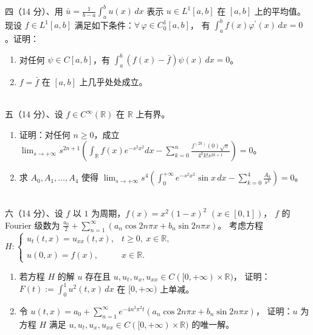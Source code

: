 ~\\
四（14 分）、用 $\displaystyle\bar{u}=\frac{1}{b-a} \int_{a}^{b} u(x) \, dx$ 表示 $u \in L^{1}[a,b]$ 在 $[a,b]$ 上的平均值。
现设 $f \in L^{1}[a,b]$ 满足如下条件：$\forall \, \varphi \in C_{0}^{1}[a,b]$，
有 $\displaystyle\int_{a}^{b} f(x) \varphi^{\prime}(x) \, dx=0$。证明：
\begin{enumerate}
\item 对任何 $\psi \in C[a,b]$，有 $\displaystyle\int_{a}^{b}(f(x)-\bar{f}) \psi(x) \, dx=0$。
\item $f=\bar{f}$ 在 $[a,b]$ 上几乎处处成立。
\end{enumerate}
~\\
五（14 分）、设 $f \in C^{\infty}(\mathbb{R})$ 在 $\mathbb{R}$ 上有界。
\begin{enumerate}
\item 证明：对任何 $n \geq 0$，成立 $\displaystyle\lim_{s \rightarrow+\infty} s^{2n+1}\left(\int_{\mathbb{R}} f(x) e^{-s^{2}x^{2}} dx-\sum_{k=0}^{n} \frac{f^{(2k)}(0) \sqrt{\pi}}{4^{k}k!s^{2k+1}}\right)=0$。
\item 求 $A_{0}, A_{1}, \ldots, A_{4}$ 使得 $\displaystyle\lim_{s \rightarrow+\infty} s^{4}\left(\int_{0}^{+\infty} e^{-s^{2}x^{2}} \sin x \, dx-\sum_{k=0}^{4} \frac{A_{k}}{s^{k}}\right)=0$。
\end{enumerate}
~\\
六（14 分）、设 $f$ 以 $1$ 为周期，$f(x)=x^{2}(1-x)^{2}$ $(x \in[0,1])$，
$f$ 的 Fourier 级数为 $\displaystyle\frac{a_{0}}{2}+\sum_{n=1}^{\infty}(a_{n} \cos 2n \pi x+b_{n} \sin 2n \pi x)$。
考虑方程 $H: \begin{cases}u_{t}(t,x)=u_{xx}(t,x), & t \geq 0,\ x \in \mathbb{R}, \\ \\ u(0, x)=f(x), & x \in \mathbb{R}.\end{cases}$
\begin{enumerate}
\item 若方程 $H$ 的解 $u$ 存在且 $u, u_{t}, u_{x}, u_{xx} \in C([0,+\infty) \times \mathbb{R})$，
证明：$F(t):=\int_{0}^{1} u^{2}(t,x) \, dx$ 在 $[0,+\infty)$ 上单减。
\item 令 $u(t, x)=a_{0}+\sum\limits_{n=1}^{\infty} e^{-4n^{2}\pi^{2}t}(a_{n} \cos 2n \pi x+b_{n} \sin 2n \pi x)$，
证明：$u$ 为方程 $H$ 满足 $u, u_{t}, u_{x}, u_{xx} \in C([0,+\infty) \times \mathbb{R})$ 的唯一解。
\end{enumerate}


